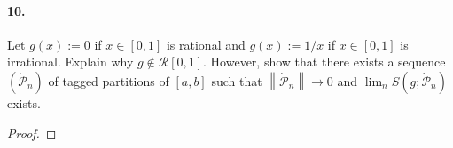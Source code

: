 \documentclass[12pt]{article}
\theoremstyle{remark}
\begin{document}
\paragraph{10.} Let $g(x):=0$ if $x \in[0,1]$ is rational and $g(x):=1 / x$ if $x \in[0,1]$ is irrational. Explain why $g \notin \mathcal{R}[0,1]$. However, show that there exists a sequence $\left(\dot{\mathcal{P}}_n\right)$ of tagged partitions of $[a, b]$ such that $\left\|\dot{\mathcal{P}}_n\right\| \rightarrow 0$ and $\lim_n S\left(g ; \dot{\mathcal{P}}_n\right)$ exists.
\begin{proof}

\end{proof}
\end{document}
